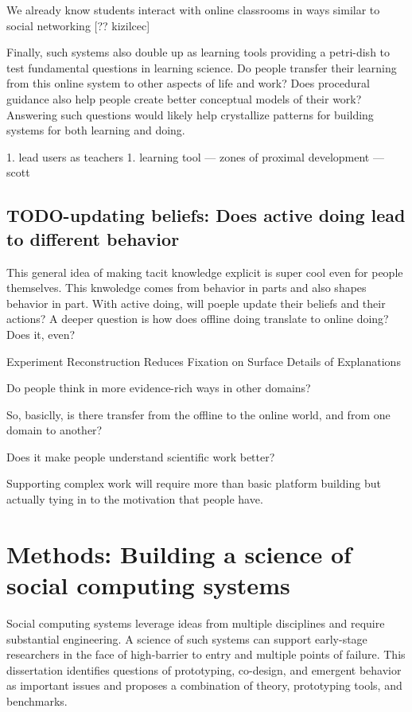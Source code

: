 We already know students interact with online classrooms in ways similar to social networking [?? kizilcec]

Finally, such systems also double up as learning tools providing a petri-dish to test fundamental questions in learning science. Do people transfer their learning from this online system to other aspects of life and work? Does procedural guidance also help people create better conceptual models of their work? Answering such questions would likely help crystallize patterns for building systems for both learning and doing.

1. lead users as teachers
    1. learning tool — zones of proximal development — scott


\subsection{TODO-updating beliefs: Does active doing lead to different behavior}
This general idea of making tacit knowledge explicit is super cool even for people themselves. This knwoledge comes from behavior in parts and also shapes behavior in part. With active doing, will poeple update their beliefs and their actions? A deeper question is how does offline doing translate to online doing? Does it, even?

Experiment Reconstruction Reduces Fixation on Surface Details of Explanations

Do people think in more evidence-rich ways in other domains?

So, basiclly, is there transfer from the offline to the online world, and from one domain to another?

Does it make people understand scientific work better?

Supporting complex work will require more than basic platform building but actually tying in to the motivation that people have.


\section{Methods: Building a science of social computing systems}

Social computing systems leverage ideas from multiple disciplines and require substantial engineering. A science of such systems can support early-stage researchers in the face of high-barrier to entry and multiple points of failure. This dissertation identifies questions of prototyping, co-design, and emergent behavior as important issues and proposes a combination of theory, prototyping tools, and benchmarks. 


